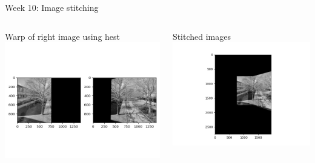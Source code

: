 \documentclass[aspectratio=169,hyperref={pdfpagelabels=false}]{beamer}
\begin{document}
\begin{frame}{ Week 10: Image stitching }
	\begin{columns}
		\begin{column}{.45\textwidth}
			\begin{block}{Warp of right image using hest}
			\includegraphics[width=\textwidth]{exercise_imgs/ex10-4.png}
			\end{block}
		\end{column}
		\begin{column}{.45\textwidth}
			\begin{block}{Stitched images}
			\includegraphics[width=\textwidth]{exercise_imgs/ex10-5.png}
			\end{block}
		\end{column}
	\end{columns}

\end{frame}
\end{document}
